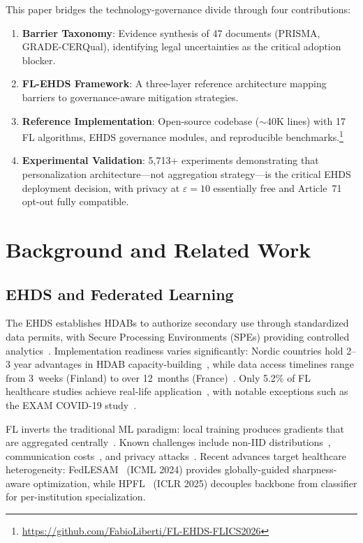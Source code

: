 \documentclass[conference]{IEEEtran}
\begin{document}
This paper bridges the technology-governance divide through four contributions:
\begin{enumerate}
    \item \textbf{Barrier Taxonomy}: Evidence synthesis of 47 documents (PRISMA, GRADE-CERQual), identifying legal uncertainties as the critical adoption blocker.
    \item \textbf{FL-EHDS Framework}: A three-layer reference architecture mapping barriers to governance-aware mitigation strategies.
    \item \textbf{Reference Implementation}: Open-source codebase ($\sim$40K lines) with 17 FL algorithms, EHDS governance modules, and reproducible benchmarks.\footnote{\url{https://github.com/FabioLiberti/FL-EHDS-FLICS2026}}
    \item \textbf{Experimental Validation}: 5,713+ experiments demonstrating that personalization architecture---not aggregation strategy---is the critical EHDS deployment decision, with privacy at $\varepsilon{=}10$ essentially free and Article~71 opt-out fully compatible.
\end{enumerate}

\section{Background and Related Work}
\label{sec:background}

\subsection{EHDS and Federated Learning}

The EHDS establishes HDABs to authorize secondary use through standardized data permits, with Secure Processing Environments (SPEs) providing controlled analytics~\cite{svingel2025hdab}. Implementation readiness varies significantly: Nordic countries hold 2--3 year advantages in HDAB capacity-building~\cite{tehdas2024ready}, while data access timelines range from 3~weeks (Finland) to over 12~months (France)~\cite{forster2025journeys}. Only 5.2\% of FL healthcare studies achieve real-life application~\cite{teo2024systematic}, with notable exceptions such as the EXAM COVID-19 study~\cite{dayan2021federated}.

FL inverts the traditional ML paradigm: local training produces gradients that are aggregated centrally~\cite{mcmahan2017communication}. Known challenges include non-IID distributions~\cite{li2020federated}, communication costs~\cite{bonawitz2019scale}, and privacy attacks~\cite{zhu2019deep, shokri2017membership}. Recent advances target healthcare heterogeneity: FedLESAM~\cite{qu2024fedlesam} (ICML 2024) provides globally-guided sharpness-aware optimization, while HPFL~\cite{chen2025hpfl} (ICLR 2025) decouples backbone from classifier for per-institution specialization.
\end{document}
